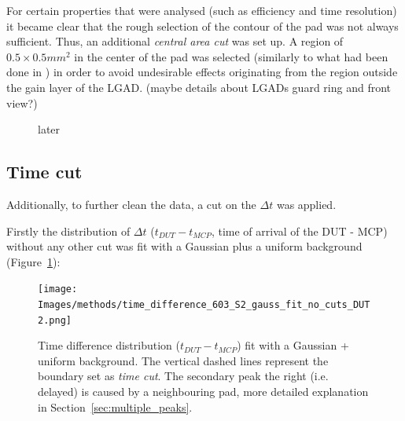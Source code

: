 
For certain properties that were analysed (such as efficiency and time resolution) it became clear that the rough selection of the contour of the pad was not always sufficient. Thus, an additional \textit{central area cut} was set up. A region of \(0.5\times0.5\si{mm^2}\) in the center of the pad was selected (similarly to what had been done in \cite{Agapopoulou_2022}) in order to avoid undesirable effects originating from the region outside the gain layer of the LGAD. (maybe details about LGADs guard ring and front view?)

\begin{figure}[h!tbp]
    \centering
    \hfill
    \captionsetup{width=\captionwidth}
    \caption{later}
\end{figure}

\subsection{Time cut}\label{subsec:time_cut}

Additionally, to further clean the data, a cut on the \(\Delta t\) was applied.

Firstly the distribution of \(\Delta t\) (\(t_{DUT}-t_{MCP}\), time of arrival of the DUT - MCP) without any other cut was fit with a Gaussian plus a uniform background (Figure~\ref{fig:time_cut_gauss+bg_fit}):

\begin{figure}[h!tbp]
    \centering
    \texttt{[image: Images/methods/time\_difference\_603\_S2\_gauss\_fit\_no\_cuts\_DUT2.png]}
    \captionsetup{width=\captionwidth}
    \caption{Time difference distribution (\(t_{DUT}-t_{MCP}\)) fit with a Gaussian + uniform background. The vertical dashed lines represent the boundary set as \textit{time cut}. The secondary peak 
     the right (i.e. delayed) is caused by a neighbouring pad, more detailed explanation in Section~\ref{sec:multiple_peaks}.}
    \label{fig:time_cut_gauss+bg_fit}
\end{figure}

